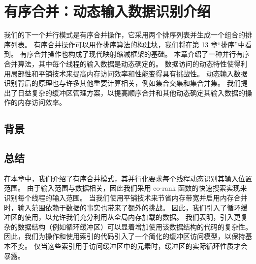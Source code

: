 \section{有序合并：动态输入数据识别介绍}
我们的下一个并行模式是有序合并操作，它采用两个排序列表并生成一个组合的排序列表。 有序合并操作可以用作排序算法的构建块，我们将在第 13 章“排序”中看到。 有序合并操作也构成了现代映射缩减框架的基础。 本章介绍了一种并行有序合并算法，其中每个线程的输入数据是动态确定的。 数据访问的动态特性使得利用局部性和平铺技术来提高内存访问效率和性能变得具有挑战性。 动态输入数据识别背后的原理也与许多其他重要计算相关，例如集合交集和集合并集。 我们提出了日益复杂的缓冲区管理方案，以提高顺序合并和其他动态确定其输入数据的操作的内存访问效率。

\subsection{背景}

\subsection{总结}
在本章中，我们介绍了有序合并模式，其并行化要求每个线程动态识别其输入位置范围。 由于输入范围与数据相关，因此我们采用 co-rank 函数的快速搜索实现来识别每个线程的输入范围。 当我们使用平铺技术来节省内存带宽并启用内存合并时，输入范围依赖于数据的事实也带来了额外的挑战。 因此，我们引入了循环缓冲区的使用，以允许我们充分利用从全局内存加载的数据。 我们表明，引入更复杂的数据结构（例如循环缓冲区）可以显着增加使用该数据结构的代码的复杂性。 因此，我们为操作和使用索引的代码引入了一个简化的缓冲区访问模型，以保持基本不变。 仅当这些索引用于访问缓冲区中的元素时，缓冲区的实际循环性质才会暴露。